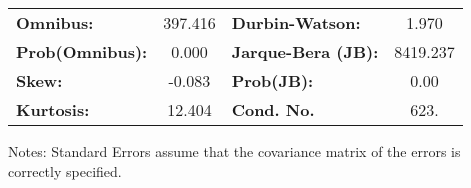 \begin{center}
\begin{tabular}{lcccccc}
\bottomrule
\end{tabular}
\begin{tabular}{lclc}
\textbf{Omnibus:}       & 397.416 & \textbf{  Durbin-Watson:     } &    1.970  \\
\textbf{Prob(Omnibus):} &   0.000 & \textbf{  Jarque-Bera (JB):  } & 8419.237  \\
\textbf{Skew:}          &  -0.083 & \textbf{  Prob(JB):          } &     0.00  \\
\textbf{Kurtosis:}      &  12.404 & \textbf{  Cond. No.          } &     623.  \\
\bottomrule
\end{tabular}
\end{center}

Notes: \newline
 [1] Standard Errors assume that the covariance matrix of the errors is correctly specified.